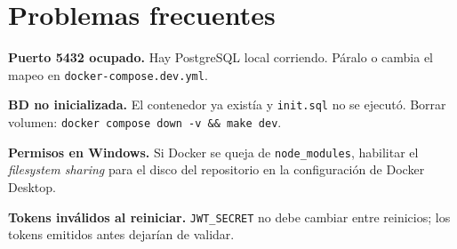 \section*{Problemas frecuentes}

\textbf{Puerto 5432 ocupado.}  Hay PostgreSQL local corriendo. Páralo o cambia el mapeo en \texttt{docker-compose.dev.yml}.

\textbf{BD no inicializada.}  El contenedor ya existía y \texttt{init.sql} no se ejecutó. Borrar volumen: \texttt{docker compose down -v \&\& make dev}.

\textbf{Permisos en Windows.}  Si Docker se queja de \texttt{node\_modules}, habilitar el \textit{filesystem sharing} para el disco del repositorio en la configuración de Docker Desktop.

\textbf{Tokens inválidos al reiniciar.}  \texttt{JWT\_SECRET} no debe cambiar entre reinicios; los tokens emitidos antes dejarían de validar.
